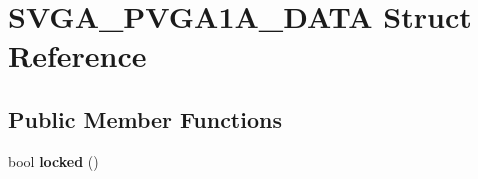 \hypertarget{structSVGA__PVGA1A__DATA}{\section{S\-V\-G\-A\-\_\-\-P\-V\-G\-A1\-A\-\_\-\-D\-A\-T\-A Struct Reference}
\label{structSVGA__PVGA1A__DATA}
}
\subsection*{Public Member Functions}
\begin{DoxyCompactItemize}
\item 
\hypertarget{structSVGA__PVGA1A__DATA_a7dc12b4154d7e0d684645df7ac2c2395}{bool {\bfseries locked} ()}\label{structSVGA__PVGA1A__DATA_a7dc12b4154d7e0d684645df7ac2c2395}

\end{DoxyCompactItemize}
